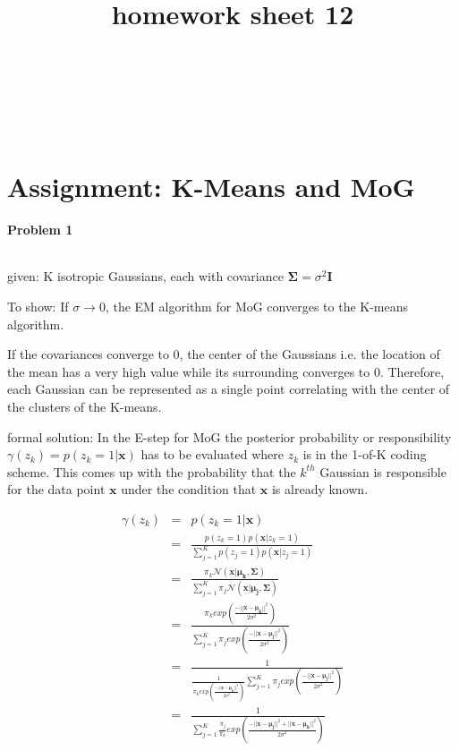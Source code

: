 \documentclass{article}
\title{homework sheet 12}
\author{
\name{Andre Seitz}\\
\imat{03622870}\\
\email{andre.seitz@mytum.de}
\And
\name{Linda Leidig} \\
\imat{03608416}\\
\email{linda.leidig@tum.de}
}
\renewcommand{\Vec}[1]{\ensuremath{\mathbf{#1}}}
\newcommand{\Mtx}[1]{\ensuremath{\mathbf{#1}}}
\begin{document}
\maketitle

\section{Assignment: K-Means and MoG}
\paragraph*{Problem 1}
$\;$ 

given: K isotropic Gaussians, each with covariance $\Mtx{\Sigma} = \sigma^2 \Mtx{I}$

To show: If $\sigma \rightarrow 0$, the EM algorithm for MoG converges to the K-means algorithm.

If the covariances converge to 0, the center of the Gaussians i.e. the location of the mean has a very high value while its surrounding converges to 0. Therefore, each Gaussian can be represented as a single point correlating with the center of the clusters of the K-means.

formal solution: In the E-step for MoG the posterior probability or responsibility $\gamma(z_k) = p(z_k = 1 | \Vec{x})$ has to be evaluated where $z_k$ is in the 1-of-K coding scheme. This comes up with the probability that the $k^{th}$ Gaussian is responsible for the data point $\Vec{x}$ under the condition that $\Vec{x}$ is already known.

\begin{eqnarray}
\gamma(z_k) &=& p(z_k=1|\Vec{x})\\
&=& \frac{p(z_k=1)p(\Vec{x}|z_k=1)}{\sum_{j=1}^{K}p(z_j=1)p(\Vec{x}|z_j=1)}\\
&=& \frac{\pi_k \mathcal{N}(\Vec{x}|\Vec{\mu_k}, \Mtx{\Sigma})}{\sum_{j=1}^K \pi_j \mathcal{N}(\Vec{x}|\Vec{\mu_j}, \Mtx{\Sigma})}\\
&=& \frac{\pi_k exp\left(\frac{-||\Vec{x}-\Vec{\mu_k}||^2}{2\sigma^2}\right)}{\sum_{j=1}^K \pi_j exp\left(\frac{-||\Vec{x}-\Vec{\mu_j}||^2}{2\sigma^2}\right)}\\
&=& \frac{1}{\frac{1}{\pi_k exp\left(\frac{-||\Vec{x}-\Vec{\mu_k}||^2}{2\sigma^2}\right)}\sum_{j=1}^K \pi_j exp\left(\frac{-||\Vec{x}-\Vec{\mu_j}||^2}{2\sigma^2}\right)}\\
&=& \frac{1}{\sum_{j=1}^K \frac{\pi_j}{\pi_k} exp\left(\frac{-||\Vec{x}-\Vec{\mu_j}||^2 + ||\Vec{x}-\Vec{\mu_k}||^2}{2\sigma^2}\right)}
\end{eqnarray}
\end{document}
